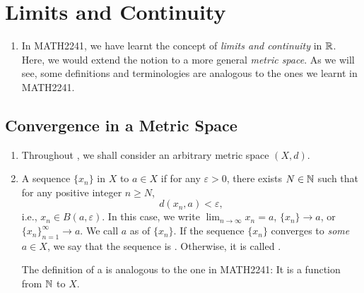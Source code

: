 \section{Limits and Continuity}
\label{sect:limits-and-cont}
\begin{enumerate}
\item In MATH2241, we have learnt the concept of \emph{limits and continuity}
in \(\mathbb{R}\). Here, we would extend the notion to a more general \emph{metric
space}. As we will see, some definitions and terminologies are analogous to the
ones we learnt in MATH2241.
\end{enumerate}
\subsection{Convergence in a Metric Space}
\label{subsect:conv-ms}
\begin{enumerate}
\item Throughout , we shall consider an arbitrary metric
space \((X,d)\).
\item A sequence \(\{x_n\}\) in \(X\)  to \(a\in X\) if for any
\(\varepsilon>0\), there exists \(N\in\mathbb{N}\) such that for any positive integer
\(n\ge N\),
\[
d(x_n,a)<\varepsilon,
\]
i.e., \(x_n\in B(a,\varepsilon)\).  In this case, we write \(\displaystyle
\lim_{n\to \infty}x_n=a\), \(\{x_n\}\to a\), or \(\{x_n\}_{n=1}^{\infty}\to
a\). We call \(a\) as  of \(\{x_n\}\). If the sequence \(\{x_n\}\)
converges to \emph{some} \(a\in X\), we say that the sequence is
. Otherwise, it is called .

\begin{note}
The definition of a  is analogous to the one in MATH2241: It is
a function from \(\mathbb{N}\) to \(X\).
\end{note}


\end{enumerate}
